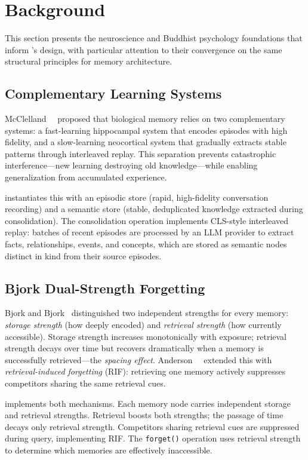 \section{Background}
\label{sec:background}

This section presents the neuroscience and Buddhist psychology foundations
that inform \alaya{}'s design, with particular attention to their
convergence on the same structural principles for memory architecture.

\subsection{Complementary Learning Systems}

McClelland~\etal~\cite{mcclelland1995} proposed that biological memory
relies on two complementary systems: a fast-learning hippocampal system that
encodes episodes with high fidelity, and a slow-learning neocortical system
that gradually extracts stable patterns through interleaved replay. This
separation prevents catastrophic interference---new learning destroying old
knowledge---while enabling generalization from accumulated experience.

\alaya{} instantiates this with an episodic store (rapid, high-fidelity
conversation recording) and a semantic store (stable, deduplicated knowledge
extracted during consolidation). The consolidation operation implements
CLS-style interleaved replay: batches of recent episodes are processed by an
LLM provider to extract facts, relationships, events, and concepts, which
are stored as semantic nodes distinct in kind from their source episodes.

\subsection{Bjork Dual-Strength Forgetting}

Bjork and Bjork~\cite{bjork1992} distinguished two independent strengths for
every memory: \emph{storage strength} (how deeply encoded) and
\emph{retrieval strength} (how currently accessible). Storage strength
increases monotonically with exposure; retrieval strength decays over time
but recovers dramatically when a memory is successfully retrieved---the
\emph{spacing effect}. Anderson~\etal~\cite{anderson1994} extended this with
\emph{retrieval-induced forgetting} (RIF): retrieving one memory actively
suppresses competitors sharing the same retrieval cues.

\alaya{} implements both mechanisms. Each memory node carries independent
storage and retrieval strengths. Retrieval boosts both strengths; the passage
of time decays only retrieval strength. Competitors sharing retrieval cues
are suppressed during query, implementing RIF. The \texttt{forget()} operation
uses retrieval strength to determine which memories are effectively
inaccessible.

